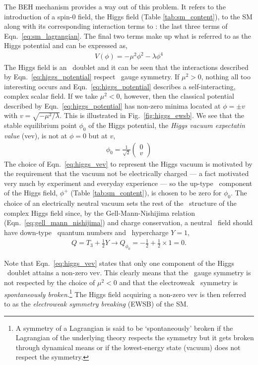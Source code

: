 The BEH mechanism provides a way out of this problem. It refers to the introduction of a
spin-0 field, the Higgs field (Table \ref{tab:sm_content}), to the SM along with its corresponding interaction
terms to \SML: the last three terms of Eqn.~\ref{eq:sm_lagrangian}. The final two terms make up
what is referred to as the Higgs potential and can be expressed as,
\begin{align}
	V(\phi) = - \mu^2 \phi^2 - \lambda \phi^4
	\label{eq:higgs_potential}
\end{align}
The Higgs field is an \SUtwo~doublet and it can be seen that the interactions
described by Eqn.~\ref{eq:higgs_potential} respect \SUtwo~gauge symmetry.
If $\mu^2>0$, nothing all too interesting occurs and Eqn.~\ref{eq:higgs_potential} describes
a self-interacting, complex scalar field. If we take $\mu^2<0$, however, then the classical
potential described by Eqn.~\ref{eq:higgs_potential} has non-zero minima located at
$\phi = \pm v$ with $v = \sqrt{-\mu^2 / \lambda}$.
This is illustrated in Fig.~\ref{fig:higgs_ewsb}. We see that the stable equilibrium point $\phi_0$
of the Higgs potential, the \textit{Higgs vacuum expectatin value} (vev), is not at $\phi = 0$
but at $v$,
\begin{align}
	\phi_0 = \frac{1}{\sqrt{2}} \left( \begin{matrix} 0 \\ v \end{matrix} \right)
	\label{eq:higgs_vev}
\end{align}
The choice of Eqn.~\ref{eq:higgs_vev} to represent the Higgs vacuum is motivated by
the requirement that the vacuum not be electrically charged --- a fact motivated very much
by experiment and everyday experience --- so the up-type \SUtwo~component of the Higgs field, $\phi^+$ (Table \ref{tab:sm_content}), is chosen to be zero for $\phi_0$. The choice of an
electrically neutral vacuum sets the rest of the \SUewk~structure of the complex Higgs field
since, by the Gell-Mann-Nishijima relation (Eqn.~\ref{eq:gell_mann_nishijima}) and charge
conservation,
a  neutral \SUewk~field should have down-type \SUtwo~quantum numbers and \Uone~hypercharge
$Y=1$,
\begin{align}
	Q = T_3 + \frac{1}{2}Y \rightarrow Q_{\phi_0} = -\frac{1}{2} + \frac{1}{2} \times 1 = 0.
	\label{eq:higgs_charge}
\end{align}

Note that Eqn.~\ref{eq:higgs_vev} states that only one component of the Higgs \SUtwo~doublet
attains a non-zero vev. This clearly means that the \SUtwo~gauge symmetry is not respected
by the choice of $\mu^2 < 0$ and that the electroweak \SUewk~symmetry is
\textit{spontaneously broken}.\footnote{A symmetry of a Lagrangian is said to be
	`spontaneously' broken if the Lagrangian of the underlying theory
	respects the symmetry but it gets broken through dynamical means or if the lowest-energy
	state (vacuum) does not respect the symmetry.
} The Higgs field
acquiring a non-zero vev is then referred to as the \textit{electroweak symmetry breaking} (EWSB) of the SM.

